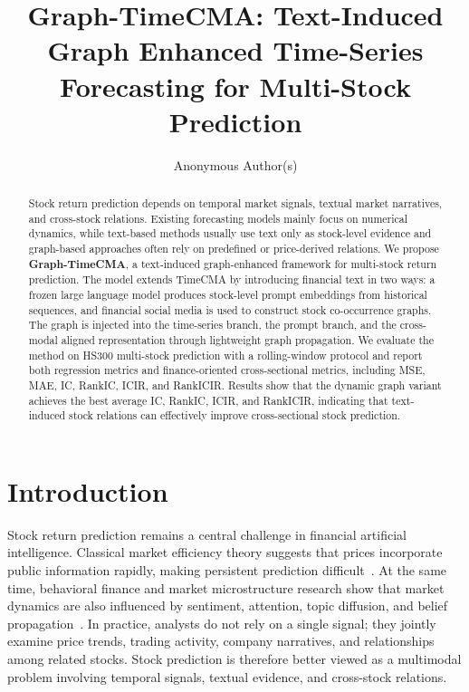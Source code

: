 \documentclass[runningheads]{llncs}
\title{Graph-TimeCMA: Text-Induced Graph Enhanced Time-Series Forecasting for Multi-Stock Prediction}
\author{Anonymous Author(s)}
\institute{Anonymous Institution\\
\email{anonymous@example.com}}
\begin{document}
\maketitle

\begin{abstract}
Stock return prediction depends on temporal market signals, textual market narratives, and cross-stock relations. Existing forecasting models mainly focus on numerical dynamics, while text-based methods usually use text only as stock-level evidence and graph-based approaches often rely on predefined or price-derived relations. We propose \textbf{Graph-TimeCMA}, a text-induced graph-enhanced framework for multi-stock return prediction. The model extends TimeCMA by introducing financial text in two ways: a frozen large language model produces stock-level prompt embeddings from historical sequences, and financial social media is used to construct stock co-occurrence graphs. The graph is injected into the time-series branch, the prompt branch, and the cross-modal aligned representation through lightweight graph propagation. We evaluate the method on HS300 multi-stock prediction with a rolling-window protocol and report both regression metrics and finance-oriented cross-sectional metrics, including MSE, MAE, IC, RankIC, ICIR, and RankICIR. Results show that the dynamic graph variant achieves the best average IC, RankIC, ICIR, and RankICIR, indicating that text-induced stock relations can effectively improve cross-sectional stock prediction.

\end{abstract}

\section{Introduction}

Stock return prediction remains a central challenge in financial artificial intelligence. Classical market efficiency theory suggests that prices incorporate public information rapidly, making persistent prediction difficult~\cite{fama1970efficient}. At the same time, behavioral finance and market microstructure research show that market dynamics are also influenced by sentiment, attention, topic diffusion, and belief propagation~\cite{baker2006investor,barber2008all,tetlock2007giving,da2011attention}. In practice, analysts do not rely on a single signal; they jointly examine price trends, trading activity, company narratives, and relationships among related stocks. Stock prediction is therefore better viewed as a multimodal problem involving temporal signals, textual evidence, and cross-stock relations.
\end{document}
